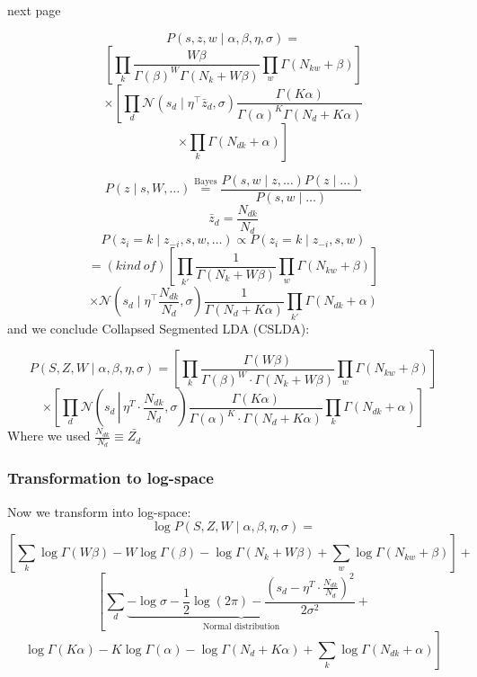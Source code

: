 \documentclass[a4paper,10pt]{article}
\begin{document}
{next page}

\[P(s, z, w \mid\alpha, \beta, \eta, \sigma) = \]
\[\left[ \prod_k \frac{W\beta}{\Gamma(\beta)^W \Gamma(N_k + W\beta)} \prod_w \Gamma(N_{kw} + \beta)\right]\]
\[\times \left[\prod_d \mathcal{N}(s_d \mid \eta^\top \bar{z}_d, \sigma) \frac{\Gamma(K\alpha)}{\Gamma(\alpha)^K\Gamma(N_d + K \alpha)}\right.\]
\[\left.\times \prod_k \Gamma(N_{dk} + \alpha)\right]\]

\[P(z\mid s, W, \dots) \overset{\text{Bayes}}{=} \frac{P(s,w \mid z, \dots) P(z\mid \dots)}{P(s,w \mid \dots)}\]
\[\bar{z}_{d} = \frac{N_{dk}}{N_d}\]
\[P(z_i = k \mid z_{-i}, s, w, \dots) \propto P(z_i =k\mid z_{-i}, s, w)\]
\[=(kind~of) \left[ \prod_{k'} \frac{1}{\Gamma(N_k + W\beta)} \prod_w \Gamma(N_{kw} + \beta)\right]\]
\[\times \mathcal{N}\left(s_d \mid \eta^\top \frac{N_{dk}}{N_d}, \sigma\right)\frac{1}{\Gamma(N_d + K\alpha)} \prod_{k'}\Gamma(N_{dk} + \alpha)\]
and we conclude
Collapsed Segmented LDA (CSLDA):

$$ P(S, Z, W \mid \alpha, \beta, \eta, \sigma) = \left[ \prod_k \frac{\Gamma(W \beta)}{\Gamma(\beta)^W \cdot \Gamma(N_k + W \beta)} \prod_w \Gamma(N_{kw} + \beta) \right] $$
$$ \times \left[ \prod_d \mathcal{N}\left(s_d\, \left|\, \eta^T \cdot \frac{N_{dk}}{N_d}, \sigma\right. \right) \frac{\Gamma(K \alpha)}{\Gamma(\alpha)^K \cdot \Gamma(N_d + K \alpha)} \prod_k \Gamma(N_{dk} + \alpha) \right] $$
Where we used $ \frac{N_{dk}}{N_d} \equiv \bar{Z_d} $

\subsubsection{Transformation to log-space}
Now we transform into log-space:
$$ \log P(S, Z, W \mid \alpha, \beta, \eta, \sigma) = $$
$$ \left[ \sum_k \log \Gamma(W \beta) - W \log \Gamma(\beta) - \log \Gamma(N_k + W \beta) + \sum_w \log \Gamma(N_{kw} + \beta) \right]+ $$
$$ \left[ \sum_d \underbrace{- \log \sigma - \frac{1}{2} \log(2 \pi) - \frac{\left(s_d - \eta^T \cdot \frac{N_{dk}}{N_d}\right)^2}{2 \sigma^2}}_{\text{Normal distribution}} + \right. $$
$$ \left. \log \Gamma(K \alpha) - K \log \Gamma(\alpha) - \log \Gamma(N_d + K \alpha) + \sum_k \log \Gamma(N_{dk} + \alpha) \right] $$
\end{document}
